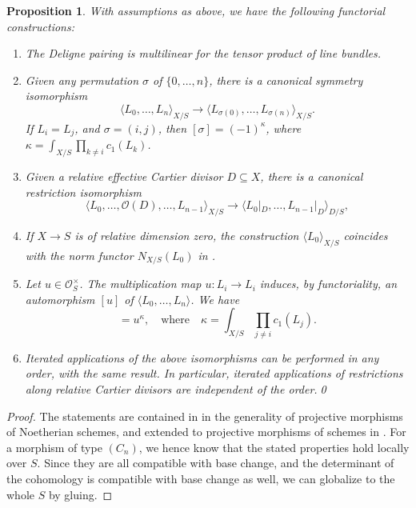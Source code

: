 \documentclass[JEP,XML,SOM,Unicode,published]{cedram}
\theoremstyle{plain}
\newtheorem{proposition}[theorem]{Proposition}
\theoremstyle{definition}
\newcommand{\Ocal}{\mathcal O}
\begin{document}
\begin{proposition}\label{prop:generalpropertiesdeligneproducts}
With assumptions as above, we have the following functorial constructions:

\begin{enumerate}
\item\label{item:Deligne-pairing-multilinear} The Deligne pairing is multilinear for the tensor product of line bundles.
\item\label{item:symmetry-deligne} Given any permutation $\sigma$ of $\lbrace 0,\ldots,n\rbrace$, there is a canonical symmetry isomorphism
\begin{equation}\label{eq:delignepairingsymmetry}
\langle L_0, \ldots,L_n\rangle_{X/S} \to \langle L_{\sigma(0)}, \ldots,L_{\sigma(n)}\rangle_{X/S}.
\end{equation}
If $L_i = L_j$, and $\sigma = (i,j)$, then $[\sigma] = (-1)^{\kappa}$, where $\kappa = \int_{X/S} \prod_{k\neq i} c_1(L_k)$.
\item\label{item:deligne-pairing-restriction} Given a relative effective Cartier divisor $D \subseteq X$, there is a canonical restriction isomorphism
\begin{equation}\label{eq:restrictiondivisor}
\langle L_{0},\ldots, \Ocal(D), \ldots, L_{n-1} \rangle_{X/S} \to \langle L_{0}|_D,\ldots,L_{n-1}|_D\rangle_{D/S},
\end{equation}
\item If $X\to S$ is of relative dimension zero, the construction $\langle L_{0} \rangle_{X/S}$ coincides with the norm functor $N_{X/S}(L_{0})$ in \cite[.5]{EGAII}.
\item\label{item:delmultiplicationbyu} Let $u \in \Ocal_S^\times$. The multiplication map $u: L_i \to L_i$ induces, by functoriality, an automorphism $[u]$ of $\langle L_0, \ldots, L_n \rangle $. We have
\begin{displaymath}
[u] = u^\kappa,\quad\text{where}\quad \kappa=\int_{X/S} \prod_{j\neq i}c_1(L_j).
\end{displaymath}
\item\label{item:order-deligne-pairing-isos} Iterated applications of the above isomorphisms can be performed in any order, with the same result. In particular, iterated applications of restrictions along relative Cartier divisors are independent of the order.\qed
\end{enumerate}
\end{proposition}

\begin{proof}
The statements are contained in \cite{Ducrot} in the generality of projective morphisms of Noetherian schemes, and extended to projective morphisms of schemes in \cite[App.]{Boucksom-Eriksson}. For a morphism of type $(C_{n})$, we hence know that the stated properties hold locally over $S$. Since they are all compatible with base change, and the determinant of the cohomology is compatible with base change as well, we can globalize to the whole $S$ by gluing.
\end{proof}
\end{document}
